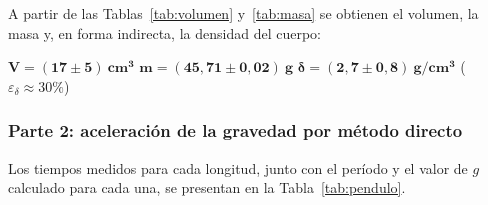 \documentclass[12pt,a4paper]{article}
\begin{document}
A partir de las Tablas~\ref{tab:volumen} y~\ref{tab:masa} se obtienen el volumen, la masa y,
en forma indirecta, la densidad del cuerpo:
\begin{center}
  $\boldsymbol{V = (17 \pm 5)\ \mathbf{cm^3}}$ \qquad
  $\boldsymbol{m = (45{,}71 \pm 0{,}02)\ \mathbf{g}}$ \qquad
  $\boldsymbol{\delta = (2{,}7 \pm 0{,}8)\ \mathbf{g/cm^3}}$
  \quad ($\varepsilon_\delta \approx 30\%$)
\end{center}

\subsubsection*{Parte 2: aceleración de la gravedad por método directo}
Los tiempos medidos para cada longitud, junto con el período y el valor de $g$ calculado
para cada una, se presentan en la Tabla~\ref{tab:pendulo}.
\end{document}
